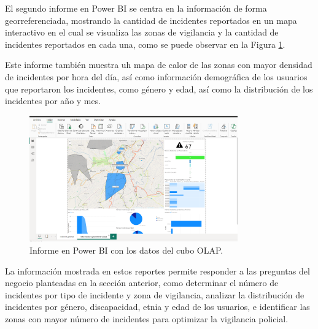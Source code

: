 El segundo informe en Power BI se centra en la información de forma georreferenciada, mostrando la cantidad de incidentes reportados
en un mapa interactivo en el cual se visualiza las zonas de vigilancia y la cantidad de incidentes reportados en cada una, como se puede
observar en la Figura \ref{fig:informe-bi-2}.
\bigbreak

Este informe también muestra uh mapa de calor de las zonas con mayor densidad de incidentes por hora del día, así como información demográfica
de los usuarios que reportaron los incidentes, como género y edad, así como la distribución de los incidentes por año y mes.

\begin{figure}[H]
    \centering
    \includegraphics[width=0.8\textwidth]{chapters/III-resultados-y-discusion/resources/images/informe-bi-geo.png}
    \caption{Informe en Power BI con los datos del cubo OLAP.}
    \label{fig:informe-bi-2}
\end{figure}

La información mostrada en estos reportes permite responder a las preguntas del negocio planteadas en la sección anterior, como determinar
el número de incidentes por tipo de incidente y zona de vigilancia, analizar la distribución de incidentes por género, discapacidad, etnia
y edad de los usuarios, e identificar las zonas con mayor número de incidentes para optimizar la vigilancia policial.



